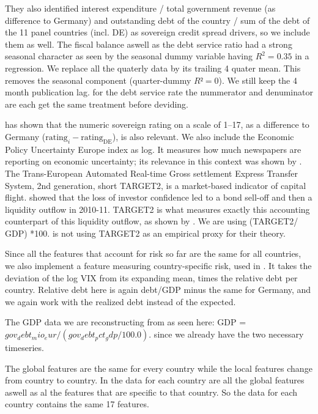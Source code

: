 They also identified interest expenditure / total government revenue
(as difference to Germany) and outstanding debt of the country / sum of
the debt of the 11 panel countries (incl. DE) as sovereign credit spread
drivers, so we include them as well. The fiscal balance aswell as the debt service ratio had a strong seasonal character as seen by the seasonal dummy variable having  $R^2=0.35$ in a regression. We replace all the quaterly data by its trailing 4 quater mean. This removes the seasonal component (quarter-dummy $R²= 0$). We still keep the 4 month publication lag. for the debt service rate the nummerator and denuminator are each get the same treatment before deviding. 

\textcite{afonso2012sovereign} has shown that the numeric sovereign rating
on a scale of 1--17, as a difference to Germany
($\text{rating}_i - \text{rating}_{\text{DE}}$), is also relevant. We also
include the Economic Policy Uncertainty Europe index as log. It measures
how much newspapers are reporting on economic uncertainty; its relevance in
this context was shown by \textcite{bernal2016epu}. The
Trans-European Automated Real-time Gross settlement Express Transfer
System, 2nd generation, short TARGET2, is a market-based indicator of
capital flight. \textcite{degrauweji2013} showed that the loss of investor
confidence led to a bond sell-off and then a liquidity outflow in 2010-11.
TARGET2 is what measures exactly this accounting counterpart of this
liquidity outflow, as shown by
\textcite{sinnwollmershaeuser2012,krishnamurthy2018}. We are using (TARGET2/ GDP) *100.
\textcite{degrauweji2013} is not using TARGET2 as an empirical proxy for
their theory.

Since all the features that account for risk so far are the same for all
countries, we also implement a feature measuring country-specific risk,
used in \textcite{afonso2015}. It takes the deviation of the log VIX from
its expanding mean, times the relative debt per country. Relative debt
here is again debt/GDP minus the same for Germany, and we again work with
the realized debt instead of the expected.

The GDP data we are reconstructing from as seen here: GDP = $gov_debt_mio_eur / (gov_debt_pct_gdp / 100.0)$. since we already have the two necessary timeseries.

The global features are the same for every country while the local features change from country to country. In the data for each country are all the global features aswell as al the features that are specific to that country. So the data for each country contains the same 17 features. 


